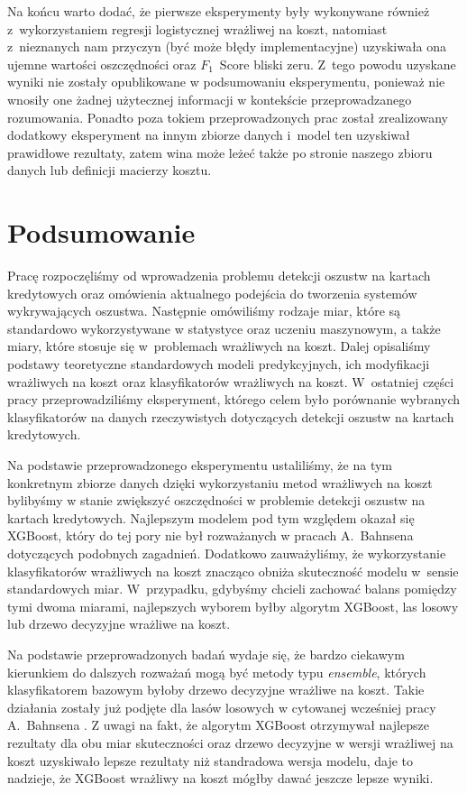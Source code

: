 \documentclass[inzynierska]{pwr_wmat_praca_dyplomowa}
\theoremstyle{plain}
\numberwithin{theorem}{chapter}
\theoremstyle{definition}
\numberwithin{theorem}{chapter}
\begin{document}
Na końcu warto dodać, że pierwsze eksperymenty były wykonywane również z~wykorzystaniem regresji logistycznej wrażliwej na koszt, natomiast z~nieznanych nam przyczyn (być może błędy implementacyjne) uzyskiwała ona ujemne wartości oszczędności oraz $F_1$~Score bliski zeru. Z~tego powodu uzyskane wyniki nie zostały opublikowane w podsumowaniu eksperymentu, ponieważ nie wnosiły one żadnej użytecznej informacji w kontekście przeprowadzanego rozumowania. Ponadto poza tokiem przeprowadzonych prac został zrealizowany dodatkowy eksperyment na innym zbiorze danych i~model ten uzyskiwał prawidłowe rezultaty, zatem wina może leżeć także po stronie naszego zbioru danych lub definicji macierzy kosztu.

\chapter*{Podsumowanie}
 
Pracę rozpoczęliśmy od wprowadzenia problemu detekcji oszustw na kartach kredytowych oraz omówienia aktualnego podejścia do tworzenia systemów wykrywających oszustwa. Następnie omówiliśmy rodzaje miar, które są standardowo wykorzystywane w statystyce oraz uczeniu maszynowym, a także miary, które stosuje się w~problemach wrażliwych na koszt. Dalej opisaliśmy podstawy teoretyczne standardowych modeli predykcyjnych, ich modyfikacji wrażliwych na koszt oraz klasyfikatorów wrażliwych na koszt. W~ostatniej części pracy przeprowadziliśmy eksperyment, którego celem było porównanie wybranych klasyfikatorów na danych rzeczywistych dotyczących detekcji oszustw na kartach kredytowych.

Na podstawie przeprowadzonego eksperymentu ustaliliśmy, że na tym konkretnym zbiorze danych dzięki wykorzystaniu metod wrażliwych na koszt bylibyśmy w stanie zwiększyć oszczędności w problemie detekcji oszustw na kartach kredytowych. Najlepszym modelem pod tym względem okazał się XGBoost, który do tej pory nie był rozważanych w pracach A.~Bahnsena dotyczących podobnych zagadnień. Dodatkowo zauważyliśmy, że wykorzystanie klasyfikatorów wrażliwych na koszt znacząco obniża skuteczność modelu w~sensie standardowych miar. W~przypadku, gdybyśmy chcieli zachować balans pomiędzy tymi dwoma miarami, najlepszych wyborem byłby algorytm XGBoost, las losowy lub drzewo decyzyjne wrażliwe na koszt.

Na podstawie przeprowadzonych badań wydaje się, że bardzo ciekawym kierunkiem do dalszych rozważań mogą być metody typu \textit{ensemble}, których klasyfikatorem bazowym byłoby drzewo decyzyjne wrażliwe na koszt. Takie działania zostały już podjęte dla lasów losowych w cytowanej wcześniej pracy A.~Bahnsena \cite{alej2015ensemble}. Z uwagi na fakt, że algorytm XGBoost otrzymywał najlepsze rezultaty dla obu miar skuteczności oraz drzewo decyzyjne w wersji wrażliwej na koszt uzyskiwało lepsze rezultaty niż standradowa wersja modelu, daje to nadzieje, że XGBoost wrażliwy na koszt mógłby dawać jeszcze lepsze wyniki.
\end{document}

